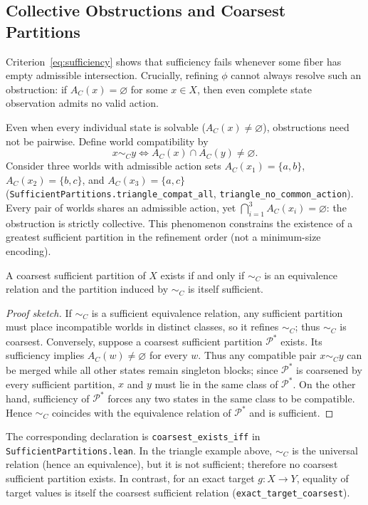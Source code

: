 \subsection{Collective Obstructions and Coarsest Partitions}
Criterion~\eqref{eq:sufficiency} shows that sufficiency fails whenever some fiber has empty admissible intersection. Crucially, refining $\phi$ cannot always resolve such an obstruction: if $A_C(x) = \varnothing$ for some $x \in X$, then even complete state observation admits no valid action.

Even when every individual state is solvable ($A_C(x) \neq \varnothing$), obstructions need not be pairwise. Define world compatibility by
\[
x \sim_C y \iff A_C(x) \cap A_C(y) \neq \varnothing.
\]
Consider three worlds with admissible action sets $A_C(x_1)=\{a,b\}$, $A_C(x_2)=\{b,c\}$, and $A_C(x_3)=\{a,c\}$ (\texttt{SufficientPartitions.triangle\_compat\_all}, \texttt{triangle\_no\_common\_action}). Every pair of worlds shares an admissible action, yet $\bigcap_{i=1}^3 A_C(x_i) = \varnothing$: the obstruction is strictly collective. This phenomenon constrains the existence of a greatest sufficient partition in the refinement order (not a minimum-size encoding).

\begin{theorem}
\label{thm:coarsest}
A coarsest sufficient partition of $X$ exists if and only if $\sim_C$ is an equivalence relation and the partition induced by $\sim_C$ is itself sufficient.
\end{theorem}

\begin{proof}[Proof sketch]
If $\sim_C$ is a sufficient equivalence relation, any sufficient partition must place incompatible worlds in distinct classes, so it refines $\sim_C$; thus $\sim_C$ is coarsest. Conversely, suppose a coarsest sufficient partition $\mathcal{P}^*$ exists. Its sufficiency implies $A_C(w)\ne\varnothing$ for every $w$. Thus any compatible pair $x\sim_C y$ can be merged while all other states remain singleton blocks; since $\mathcal{P}^*$ is coarsened by every sufficient partition, $x$ and $y$ must lie in the same class of $\mathcal{P}^*$. On the other hand, sufficiency of $\mathcal{P}^*$ forces any two states in the same class to be compatible. Hence $\sim_C$ coincides with the equivalence relation of $\mathcal{P}^*$ and is sufficient.
\end{proof}

The corresponding declaration is \texttt{coarsest\_exists\_iff} in \texttt{SufficientPartitions.lean}. In the triangle example above, $\sim_C$ is the universal relation (hence an equivalence), but it is not sufficient; therefore no coarsest sufficient partition exists. In contrast, for an exact target $g:X\to Y$, equality of target values is itself the coarsest sufficient relation (\texttt{exact\_target\_coarsest}).

